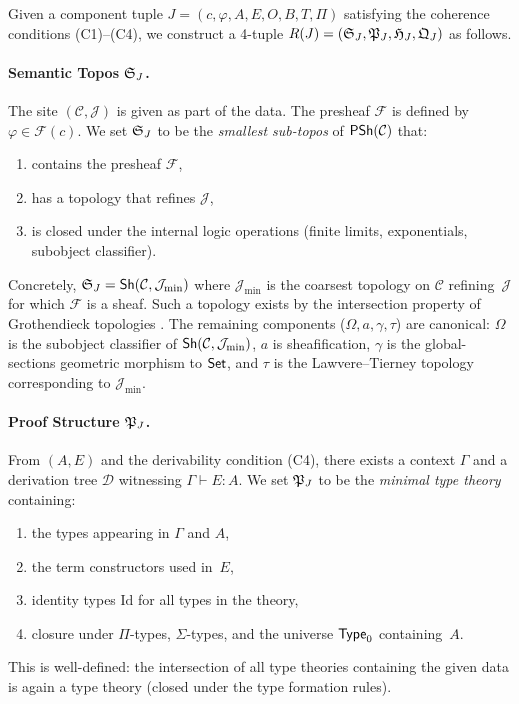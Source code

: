 \begin{construction}
\label{con:enrichment}
Given a component tuple $J = (c, \varphi, A, E, O, B, T, \Pi)$ satisfying
the coherence conditions (C1)--(C4), we construct a 4-tuple
$R(J) = (\mathfrak{S}_J, \mathfrak{P}_J, \mathfrak{H}_J, \mathfrak{Q}_J)$ as follows.

\paragraph{Semantic Topos $\mathfrak{S}_J$.}
The site $(\mathcal{C}, \mathcal{J})$ is given as part of the data.
The presheaf $\mathcal{F}$ is defined by $\varphi \in \mathcal{F}(c)$.
We set $\mathfrak{S}_J$ to be the \emph{smallest sub-topos} of
$\mathsf{PSh}(\mathcal{C})$ that:
\begin{enumerate}[label=(\alph*),nosep]
\item contains the presheaf $\mathcal{F}$,
\item has a topology that refines $\mathcal{J}$,
\item is closed under the internal logic operations
  (finite limits, exponentials, subobject classifier).
\end{enumerate}
Concretely, $\mathfrak{S}_J = \mathsf{Sh}(\mathcal{C}, \mathcal{J}_{\mathrm{min}})$
where $\mathcal{J}_{\mathrm{min}}$ is the coarsest topology on
$\mathcal{C}$ refining~$\mathcal{J}$ for which $\mathcal{F}$ is a
sheaf.  Such a topology exists by the intersection property of
Grothendieck topologies \cite{johnstone2002}.
The remaining components ($\Omega, a, \gamma, \tau$) are canonical:
$\Omega$ is the subobject classifier of $\mathsf{Sh}(\mathcal{C},
\mathcal{J}_{\mathrm{min}})$, $a$ is sheafification,
$\gamma$ is the global-sections geometric morphism to $\mathsf{Set}$,
and $\tau$ is the Lawvere--Tierney topology corresponding to
$\mathcal{J}_{\mathrm{min}}$.

\paragraph{Proof Structure $\mathfrak{P}_J$.}
From $(A, E)$ and the derivability condition (C4), there exists a
context $\Gamma$ and a derivation tree $\mathcal{D}$ witnessing
$\Gamma \vdash E : A$.  We set $\mathfrak{P}_J$ to be the
\emph{minimal type theory} containing:
\begin{enumerate}[label=(\alph*),nosep]
\item the types appearing in $\Gamma$ and $A$,
\item the term constructors used in~$E$,
\item identity types $\mathrm{Id}$ for all types in the theory,
\item closure under $\Pi$-types, $\Sigma$-types, and the universe
  $\mathsf{Type}_0$ containing~$A$.
\end{enumerate}
This is well-defined: the intersection of all type theories containing
the given data is again a type theory (closed under the type formation
rules).


\end{construction}
